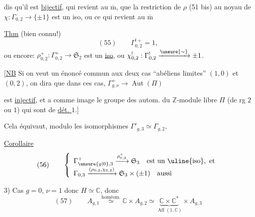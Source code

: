  dis qu'il est \uline{bijectif}, 
qui revient au $\overline{\mathrm m}$, que la restriction de $\rho$ (51 bis) au noyau  de $\chi:\Gamma_{0,2}\longrightarrow\{\pm1\}$ est un iso, ou ce qui revient au $\overline{\mathrm m}$

\uline{Thm} (bien connu!)
\[
(55)\qquad\Gamma^{!+}_{0,2}=1,
\]
ou encore:
$\rho^+_{0,2}:\Gamma^+_{0,2}\longrightarrow\mathfrak S_2$ est un \uline{iso}, ou $\chi^!_{0,2}:\Gamma^!_{0,2}\xrightarrow{\unsure{\sim}}\pm1$.

[\uline{NB} Si on veut un énoncé commun aux deux cas ``abéliens limites'' $(1,0)$ et $(0,2)$, on dira que dans ces cas, $\Gamma^+_{g,\nu}\longrightarrow\operatorname{Aut}(\Pi)$

est \uline{injectif}, et a comme image  le groupe des autom. du $\mathbb{Z}$-module libre $\Pi$ (de rg $2$ ou $1$) qui sont de \uline{dét. $1$}.]

Cela équivaut, modulo les isomorphismes $\Gamma'_{g,3}\simeq\Gamma_{g,2}$, 

\uline{Corollaire}
\[
(56)\qquad\left\{\begin{array}{l}
\Gamma^+_{\unsure{g|0},3}\xrightarrow{\rho^+_{0,3}}\mathfrak S_3\quad\text{est un }\uline{\text{iso}},\text{ et}\\
\Gamma_{0,3}\xrightarrow{(\rho_{0,3},\chi_{0,3})}\mathfrak S_3\times(\pm1)\quad\text{aussi}
\end{array}\right.
\]


3) Cas $g=0$, $\nu=1$ donc $H\simeq\mathbb{C}$, donc
\[
(57)\qquad A_{g,1}\overset{\text{homéom.}}{\simeq}\mathbb{C}\times A_{g,2}\simeq\underbrace{\mathbb{C}\times\mathbb{C}^*}_{\operatorname{Aff}(1,\mathbb{C})}\times A_{g,3}
\]


